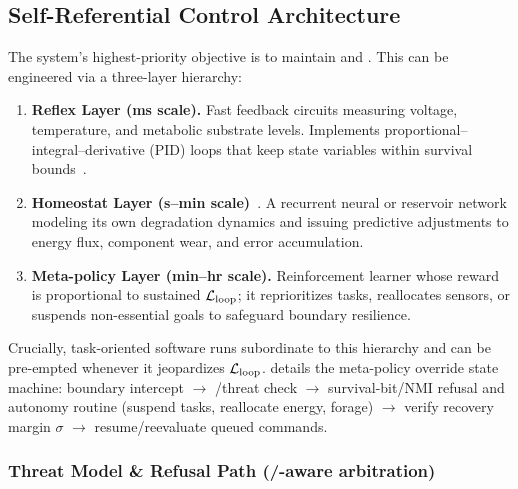 \documentclass[11pt]{article}
\begin{document}
\subsection{Self-Referential Control Architecture}
\label{sec:self_ref_arch}

The system's highest-priority objective is to maintain \NC and \SC. This can be engineered via a three-layer hierarchy:

\begin{enumerate}
\item \textbf{Reflex Layer (ms scale).} Fast feedback circuits measuring voltage, temperature, and metabolic substrate levels. Implements proportional--integral--derivative (PID) loops that keep state variables within survival bounds~\cite{wiener1961cybernetics}.
\item \textbf{Homeostat Layer (s--min scale)}~\cite{ashby1956introduction}. A recurrent neural or reservoir network modeling its own degradation dynamics and issuing predictive adjustments to energy flux, component wear, and error accumulation.
\item \textbf{Meta-policy Layer (min--hr scale).} Reinforcement learner whose reward is proportional to sustained $\mathcal{L}_{\text{loop}}$; it reprioritizes tasks, reallocates sensors, or suspends non-essential goals to safeguard boundary resilience.
\end{enumerate}

Crucially, task-oriented software runs subordinate to this hierarchy and can be pre-empted whenever it jeopardizes $\mathcal{L}_{\text{loop}}$.  details the meta-policy override state machine: boundary intercept $\rightarrow$ \NC/\SC threat check $\rightarrow$ survival-bit/NMI refusal and autonomy routine (suspend tasks, reallocate energy, forage) $\rightarrow$ verify recovery margin $\sigma$ $\rightarrow$ resume/reevaluate queued commands.


\subsubsection{Threat Model \& Refusal Path (\NC/\SC-aware arbitration)}
\label{sec:threat_model}
\end{document}

